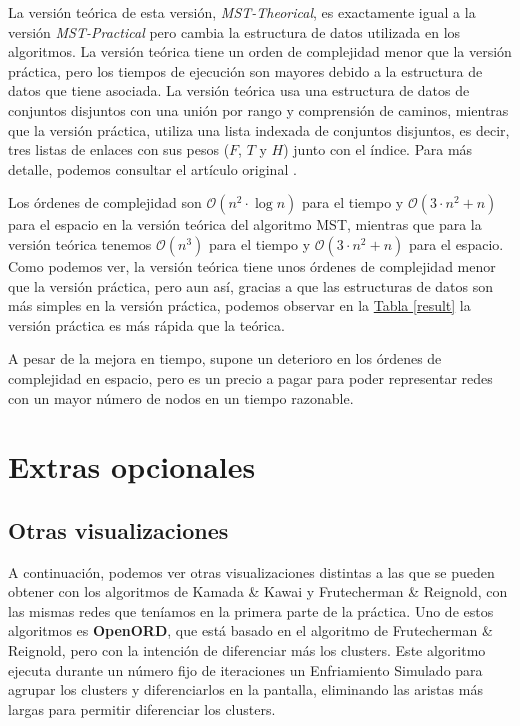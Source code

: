 \documentclass[paper=a4, fontsize=11pt]{article} %
\numberwithin{equation}{section} %
\numberwithin{figure}{section} %
\numberwithin{table}{section} %
\begin{document}
La versión teórica de esta versión, \textit{MST-Theorical}, es exactamente igual a la versión \textit{MST-Practical} pero cambia la estructura de datos utilizada en los algoritmos. La versión teórica tiene un orden de complejidad menor que la versión práctica, pero los tiempos de ejecución son mayores debido a la estructura de datos que tiene asociada. La versión teórica usa una estructura de datos de conjuntos disjuntos con una unión por rango y comprensión de caminos, mientras que la versión práctica, utiliza una lista indexada de conjuntos disjuntos, es decir, tres listas de enlaces con sus pesos ($F$, $T$ y $H$) junto con el índice. Para más detalle, podemos consultar el artículo original \cite{alg}.

Los órdenes de complejidad son $\mathcal{O}(n^2\cdot\log n)$ para el tiempo y $\mathcal{O}(3\cdot n^2+n)$ para el espacio en la versión teórica del algoritmo MST, mientras que para la versión teórica tenemos $\mathcal{O}(n^3)$ para el tiempo y $\mathcal{O}(3\cdot n^2+n)$ para el espacio. Como podemos ver, la versión teórica tiene unos órdenes de complejidad menor que la versión práctica, pero aun así, gracias a que las estructuras de datos son más simples en la versión práctica, podemos observar en la \hyperref[result]{Tabla \ref*{result}} la versión práctica es más rápida que la teórica.

A pesar de la mejora en tiempo, supone un deterioro en los órdenes de complejidad en espacio, pero es un precio a pagar para poder representar redes con un mayor número de nodos en un tiempo razonable.

\section{Extras opcionales}

\subsection{Otras visualizaciones}

A continuación, podemos ver otras visualizaciones distintas a las que se pueden obtener con los algoritmos de Kamada \& Kawai y Frutecherman \& Reignold, con las mismas redes que teníamos en la primera parte de la práctica. Uno de estos algoritmos es \textbf{OpenORD}, que está basado en el algoritmo de Frutecherman \& Reignold, pero con la intención de diferenciar más los clusters. Este algoritmo ejecuta durante un número fijo de iteraciones un Enfriamiento Simulado para agrupar los clusters y diferenciarlos en la pantalla, eliminando las aristas más largas para permitir diferenciar los clusters.
\end{document}
